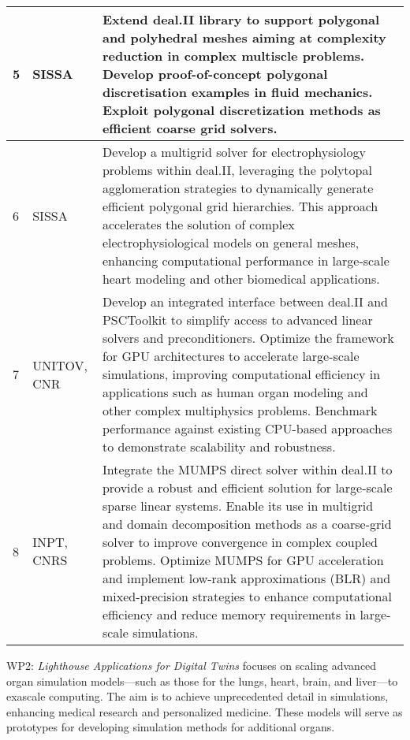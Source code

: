 \documentclass[a4paper,12pt]{article}
\begin{document}
\begin{center}
\begin{longtable}{|l|p{2.5cm}|p{12cm}|}
    \\
    \hline
    5 & SISSA &
    Extend deal.II library to support polygonal and polyhedral meshes aiming at complexity reduction in complex multiscle problems. Develop proof-of-concept polygonal discretisation examples in fluid mechanics. Exploit polygonal discretization methods as efficient coarse grid solvers.
    \\
    \hline
    6 & SISSA &
    Develop a multigrid solver for electrophysiology problems within deal.II, leveraging the polytopal agglomeration strategies to dynamically generate efficient polygonal grid hierarchies. This approach accelerates the solution of complex electrophysiological models on general meshes, enhancing computational performance in large-scale heart modeling and other biomedical applications.  
    \\
    \hline
    7 & UNITOV, CNR &
    Develop an integrated interface between deal.II and PSCToolkit to simplify access to advanced linear solvers and preconditioners. Optimize the framework for GPU architectures to accelerate large-scale simulations, improving computational efficiency in applications such as human organ modeling and other complex multiphysics problems. Benchmark performance against existing CPU-based approaches to demonstrate scalability and robustness.
    \\
    \hline
    8 & INPT, CNRS &
    Integrate the MUMPS direct solver within deal.II to provide a robust and efficient solution for large-scale sparse linear systems. Enable its use in multigrid and domain decomposition methods as a coarse-grid solver to improve convergence in complex coupled problems. Optimize MUMPS for GPU acceleration and implement low-rank approximations (BLR) and mixed-precision strategies to enhance computational efficiency and reduce memory requirements in large-scale simulations.
    \\
    \hline
    \end{longtable}
\end{center}

\newpage

WP2: \textit{Lighthouse Applications for Digital Twins} focuses on scaling advanced organ simulation models—such as those for the lungs, heart, brain, and liver—to exascale computing. The aim is to achieve unprecedented detail in simulations, enhancing medical research and personalized medicine. These models will serve as prototypes for developing simulation methods for additional organs.
\end{document}
